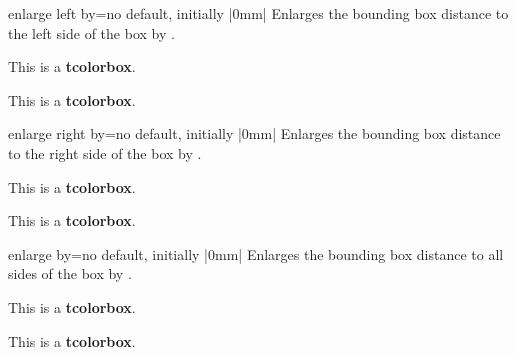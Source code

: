 \begin{docTcbKey}{enlarge left by}{=}{no default, initially |0mm|}
  Enlarges the bounding box distance to the left side of the box by .
\begin{dispExample}

\begin{tcolorbox}[enlarge left by=2cm,width=5cm,enhanced,show bounding box]
This is a \textbf{tcolorbox}.
\end{tcolorbox}
\begin{tcolorbox}[enlarge left by=-2cm,width=\linewidth+2cm]
This is a \textbf{tcolorbox}.
\end{tcolorbox}
\end{dispExample}
\end{docTcbKey}

\begin{docTcbKey}{enlarge right by}{=}{no default, initially |0mm|}
  Enlarges the bounding box distance to the right side of the box by .
\begin{dispExample}

\begin{tcolorbox}[enlarge right by=-2cm,width=\linewidth+2cm,
  enhanced,show bounding box]
This is a \textbf{tcolorbox}.
\end{tcolorbox}
\begin{tcolorbox}[enlarge right by=2cm,width=\linewidth-2cm]
This is a \textbf{tcolorbox}.
\end{tcolorbox}
\end{dispExample}
\end{docTcbKey}

\clearpage
\begin{docTcbKey}{enlarge by}{=}{no default, initially |0mm|}
  Enlarges the bounding box distance to all sides of the box by .
\begin{dispExample}

\begin{tcolorbox}
This is a \textbf{tcolorbox}.
\end{tcolorbox}
\begin{tcolorbox}[enlarge by=5mm,enhanced,show bounding box]
This is a \textbf{tcolorbox}.
\end{tcolorbox}
\end{dispExample}
\end{docTcbKey}


